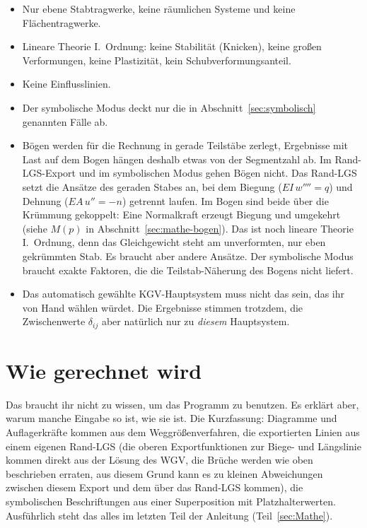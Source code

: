 \begin{itemize}
  \item Nur ebene Stabtragwerke, keine räumlichen Systeme und keine Flächentragwerke.
  \item Lineare Theorie I.~Ordnung: keine Stabilität (Knicken), keine großen Verformungen, keine
        Plastizität, kein Schubverformungsanteil.
  \item Keine Einflusslinien.
  \item Der symbolische Modus deckt nur die in Abschnitt~\ref{sec:symbolisch} genannten Fälle ab.
  \item Bögen werden für die Rechnung in gerade Teilstäbe zerlegt, Ergebnisse mit Last auf dem
        Bogen hängen deshalb etwas von der Segmentzahl ab. Im Rand-LGS-Export und im symbolischen
        Modus gehen Bögen nicht. Das Rand-LGS setzt die Ansätze des geraden Stabes an, bei dem
        Biegung ($EI\,w'''' = q$) und Dehnung ($EA\,u'' = -n$) getrennt laufen. Im Bogen sind beide
        über die Krümmung gekoppelt: Eine Normalkraft erzeugt Biegung und umgekehrt (siehe $M(p)$ in
        Abschnitt~\ref{sec:mathe-bogen}). Das ist noch lineare Theorie I.~Ordnung, denn das
        Gleichgewicht steht am unverformten, nur eben gekrümmten Stab. Es braucht aber andere
        Ansätze. Der symbolische Modus braucht exakte Faktoren, die die Teilstab-Näherung des Bogens
        nicht liefert.
  \item Das automatisch gewählte KGV-Hauptsystem muss nicht das sein, das ihr von Hand wählen
        würdet. Die Ergebnisse stimmen trotzdem, die Zwischenwerte $\delta_{ij}$ aber natürlich
        nur zu \emph{diesem} Hauptsystem.
\end{itemize}

\section{Wie gerechnet wird}

Das braucht ihr nicht zu wissen, um das Programm zu benutzen. Es erklärt aber, warum manche
Eingabe so ist, wie sie ist. Die Kurzfassung: Diagramme und Auflagerkräfte kommen aus dem
Weggrößenverfahren, die exportierten Linien aus einem eigenen Rand-LGS (die oberen Exportfunktionen zur Biege- und Längslinie
kommen direkt aus der Lösung des WGV, die Brüche werden wie oben beschrieben erraten, aus diesem Grund kann es zu kleinen Abweichungen
zwischen diesem Export und dem über das Rand-LGS kommen), die symbolischen
Beschriftungen aus einer Superposition mit Platzhalterwerten. Ausführlich steht das alles im
letzten Teil der Anleitung (Teil~\ref{sec:Mathe}).

